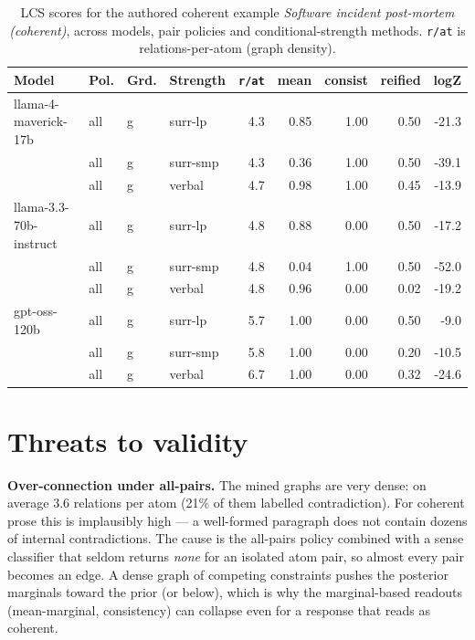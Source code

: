 \documentclass[11pt]{article}
\begin{document}
\begin{table}[htbp]
\centering
\footnotesize
\setlength{\tabcolsep}{4pt}
\caption{LCS scores for the authored coherent example \emph{Software incident post-mortem (coherent)}, across models, pair policies and conditional-strength methods. \texttt{r/at} is relations-per-atom (graph density).}
\label{tab:coherent}
\begin{tabular}{llllrrrrr}
\toprule
\textbf{Model} & \textbf{Pol.} & \textbf{Grd.} & \textbf{Strength} & \texttt{r/at} & mean & consist & reified & logZ \\
\midrule
llama-4-maverick-17b & all & g & surr-lp & 4.3 & 0.85 & 1.00 & 0.50 & -21.3 \\
 & all & g & surr-smp & 4.3 & 0.36 & 1.00 & 0.50 & -39.1 \\
 & all & g & verbal & 4.7 & 0.98 & 1.00 & 0.45 & -13.9 \\
\midrule
llama-3.3-70b-instruct & all & g & surr-lp & 4.8 & 0.88 & 0.00 & 0.50 & -17.2 \\
 & all & g & surr-smp & 4.8 & 0.04 & 1.00 & 0.50 & -52.0 \\
 & all & g & verbal & 4.8 & 0.96 & 0.00 & 0.02 & -19.2 \\
\midrule
gpt-oss-120b & all & g & surr-lp & 5.7 & 1.00 & 0.00 & 0.50 & -9.0 \\
 & all & g & surr-smp & 5.8 & 1.00 & 0.00 & 0.20 & -10.5 \\
 & all & g & verbal & 6.7 & 1.00 & 0.00 & 0.32 & -24.6 \\
\bottomrule
\end{tabular}
\end{table}


\section{Threats to validity}

\textbf{Over-connection under all-pairs.} The mined graphs are very dense: on average 3.6 relations per atom (21\% of them labelled contradiction). For coherent prose this is implausibly high --- a well-formed paragraph does not contain dozens of internal contradictions. The cause is the all-pairs policy combined with a sense classifier that seldom returns \emph{none} for an isolated atom pair, so almost every pair becomes an edge. A dense graph of competing constraints pushes the posterior marginals toward the prior (or below), which is why the marginal-based readouts (mean-marginal, consistency) can collapse even for a response that reads as coherent.
\end{document}

